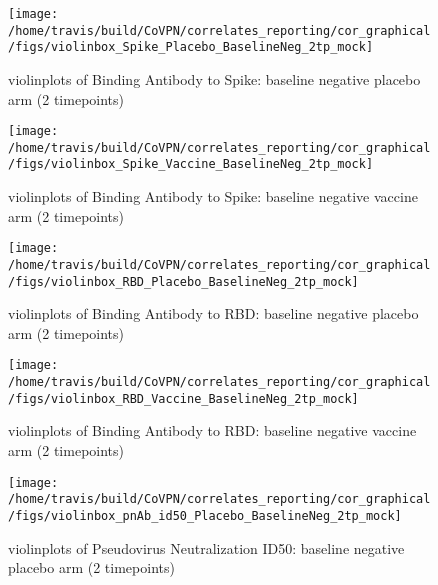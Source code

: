 \documentclass[]{book}
\theoremstyle{definition}
\theoremstyle{definition}
\theoremstyle{definition}
\newcommand{\1}{\mathbbm{1}}
\begin{document}
\clearpage
\begin{figure}[H]

{\centering \texttt{[image: /home/travis/build/CoVPN/correlates\_reporting/cor\_graphical/figs/violinbox\_Spike\_Placebo\_BaselineNeg\_2tp\_mock]} 

}

\caption{violinplots of Binding Antibody to Spike: baseline negative placebo arm (2 timepoints)}\label{fig:unnamed-chunk-35}
\end{figure}

\clearpage
\begin{figure}[H]

{\centering \texttt{[image: /home/travis/build/CoVPN/correlates\_reporting/cor\_graphical/figs/violinbox\_Spike\_Vaccine\_BaselineNeg\_2tp\_mock]} 

}

\caption{violinplots of Binding Antibody to Spike: baseline negative vaccine arm (2 timepoints)}\label{fig:unnamed-chunk-36}
\end{figure}

\clearpage
\begin{figure}[H]

{\centering \texttt{[image: /home/travis/build/CoVPN/correlates\_reporting/cor\_graphical/figs/violinbox\_RBD\_Placebo\_BaselineNeg\_2tp\_mock]} 

}

\caption{violinplots of Binding Antibody to RBD: baseline negative placebo arm (2 timepoints)}\label{fig:unnamed-chunk-37}
\end{figure}

\clearpage
\begin{figure}[H]

{\centering \texttt{[image: /home/travis/build/CoVPN/correlates\_reporting/cor\_graphical/figs/violinbox\_RBD\_Vaccine\_BaselineNeg\_2tp\_mock]} 

}

\caption{violinplots of Binding Antibody to RBD: baseline negative vaccine arm (2 timepoints)}\label{fig:unnamed-chunk-38}
\end{figure}

\clearpage
\begin{figure}[H]

{\centering \texttt{[image: /home/travis/build/CoVPN/correlates\_reporting/cor\_graphical/figs/violinbox\_pnAb\_id50\_Placebo\_BaselineNeg\_2tp\_mock]} 

}

\caption{violinplots of Pseudovirus Neutralization ID50: baseline negative placebo arm (2 timepoints)}\label{fig:unnamed-chunk-39}
\end{figure}
\end{document}
